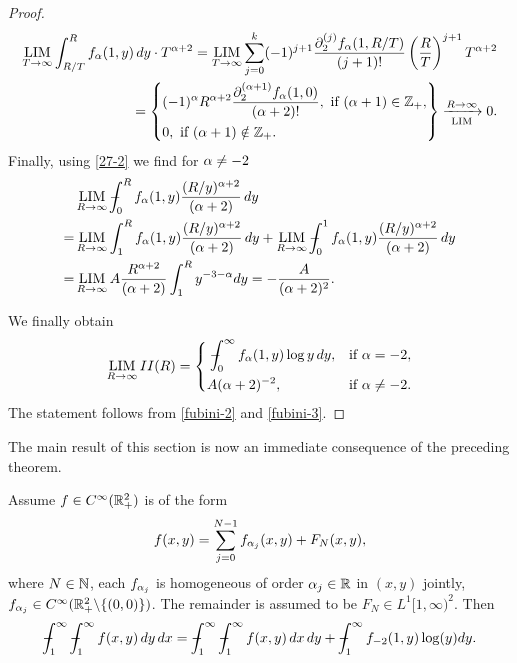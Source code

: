 \begin{proof}
\begin{equation}
\begin{split}
\operatorname*{LIM}_{T\to\infty} \int_{R/T}^R f_{\mathrm{\alpha}}(1,y)\, dy \cdot T^{\mathrm{\alpha}+2} 
=\operatorname*{LIM}_{T\to\infty}  \sum_{j=0}^{k} (-1)^{j+1}\frac{\partial_2^{(j)}f_{\mathrm{\alpha}}(1,R/T)}{(j+1)!} 
\left(\frac{R}{T}\right)^{j+1} T^{\mathrm{\alpha}+2} \\
= \left\{
\begin{split}
&(-1)^{\mathrm{\alpha}} R^{\mathrm{\alpha}+2} \frac{\partial_2^{(\mathrm{\alpha}+1)}f_{\mathrm{\alpha}}(1,0)}{(\mathrm{\alpha}+2)!}
, \ \textup{if} \ (\mathrm{\alpha}+1)\in \mathbb{Z}_+, \\
&0, \ \textup{if} \ (\mathrm{\alpha}+1)\notin \mathbb{Z}_+.
\end{split}
\right\} \xrightarrow[\operatorname*{LIM}]{R\to \infty} 0.
\end{split}
\end{equation}
Finally, using \eqref{27-2} we find for $\mathrm{\alpha}\neq -2$
\begin{equation}
\begin{split}
&\operatorname*{LIM}_{R\to \infty} 
-\hspace*{-1em}\int_0^R f_{\mathrm{\alpha}}(1,y) \frac{(R/y)^{\mathrm{\alpha}+2}}{(\mathrm{\alpha}+2)} \, dy \\
= &\operatorname*{LIM}_{R\to \infty} 
\int_1^R f_{\mathrm{\alpha}}(1,y) \frac{(R/y)^{\mathrm{\alpha}+2}}{(\mathrm{\alpha}+2)} \, dy 
+\operatorname*{LIM}_{R\to \infty} 
-\hspace*{-1em}\int_0^1 f_{\mathrm{\alpha}}(1,y) \frac{(R/y)^{\mathrm{\alpha}+2}}{(\mathrm{\alpha}+2)} \, dy \\
= &\operatorname*{LIM}_{R\to \infty}
A \frac{R^{\mathrm{\alpha}+2}}{(\mathrm{\alpha}+2)} \int_1^R y^{-3-\mathrm{\alpha}} dy 
= - \frac{A}{(\mathrm{\alpha}+2)^2}.
\end{split}
\end{equation}

We finally obtain
\begin{equation}
\label{fubini-3}
\LIM_{R\to \infty}II(R)=
\left\{
\begin{split}
&\regint_{0}^\infty f_\A(1,y) \log y \, dy, &\textup{if} \ \A=-2, \\
&  A (\A+2)^{-2}, &\textup{if} \ \A\neq-2. 
\end{split}
\right.
\end{equation}
The statement follows from \eqref{fubini-2}
and \eqref{fubini-3}.
\end{proof}

The main result of this section is 
now an immediate consequence of the 
preceding theorem.
\begin{theorem}
Assume $f\in C^{\infty}(\mathbb{R}_+^2)$ is of the form 
\begin{align}
f(x,y) = \sum_{j=0}^{N-1}f_{\mathrm{\alpha}_j}(x,y) + F_N(x,y),
\end{align}
where $N\in \mathbb{N}$, each $f_{\mathrm{\alpha}_j}$ is homogeneous of order $\mathrm{\alpha}_j\in \mathbb{R}$ in 
$(x,y)$ jointly, $f_{\mathrm{\alpha}_j}\in C^\infty(\mathbb{R}^2_+\backslash\{(0,0)\})$.
The remainder is assumed to be $F_N\in L^1[1,\infty)^2$. Then 
\begin{align}
\regint_1^\infty\regint_1^\infty f(x,y) \, dy \, dx = 
\regint_1^\infty \regint_1^\infty f(x,y) \, dx \, dy + 
\regint_1^\infty f_{-2}(1,y)\log(y) dy.
\end{align}  
\end{theorem}

